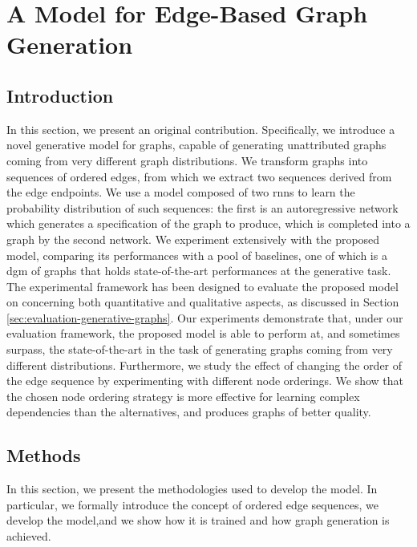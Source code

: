 \chapter{A Model for Edge-Based Graph Generation} %
\label{ch:deep-generative-learning-graphs}

\section{Introduction}
In this section, we present an original contribution. Specifically, we introduce a novel generative model for graphs, capable of generating unattributed graphs coming from very different graph distributions. We transform graphs into sequences of ordered edges, from which we extract two sequences derived from the edge endpoints. We use a model composed of two \glspl{rnn} to learn the probability distribution of such sequences: the first is an autoregressive network which generates a specification of the graph to produce, which is completed into a graph by the second network. We experiment extensively with the proposed model, comparing its performances with a pool of baselines, one of which is a \gls{dgm} of graphs that holds state-of-the-art performances at the generative task. The experimental framework has been designed to evaluate the proposed model on concerning both quantitative and qualitative aspects, as discussed in Section \ref{sec:evaluation-generative-graphs}. Our experiments demonstrate that, under our evaluation framework, the proposed model is able to perform at, and sometimes surpass, the state-of-the-art in the task of generating graphs coming from very different distributions. Furthermore, we study the effect of changing the order of the edge sequence by experimenting with different node orderings. We show that the chosen node ordering strategy  is more effective for learning complex dependencies than the alternatives, and produces graphs of better quality.

\section{Methods}
In this section, we present the methodologies used to develop the model. In particular, we formally introduce the concept of ordered edge sequences, we develop the model,and  we show how it is trained and how graph generation is achieved.

